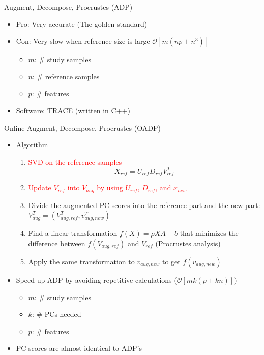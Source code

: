 \documentclass{beamer}
\newcommand{\bO}{\mathcal{O}}
\begin{document}
\begin{frame}{Augment, Decompose, Procrustes (ADP)}
    \begin{itemize}
    \item Pro: Very accurate (The golden standard)
    \item Con: Very slow when reference size is large $\bO[m(np+n^3)]$
        \begin{itemize}
        \item $m$: \# study samples
        \item $n$: \# reference samples
        \item $p$: \# features
        \end{itemize}
    \item Software: TRACE (written in C++) 
    \end{itemize}
\end{frame}

\begin{frame}{Online Augment, Decompose, Procrustes (OADP)}
\begin{itemize}
\item Algorithm
    \begin{enumerate}
    \item \textcolor{red}{SVD on the reference samples}
        \[
            X_{ref} = U_{ref} D_{ref} V_{ref}^T
        \]
    \item \textcolor{red}{Update $V_{ref}$ into $V_{aug}$ by using $U_{ref}$, $D_{ref}$, and $x_{new}$}
    \item Divide the augmented PC scores
        into the reference part and the new part:
        $V_{aug}^T = (V_{aug, ref}^T, v_{aug, new}^T)$
    \item Find a linear transformation
        $f(X) = \rho XA + b$ 
        that minimizes the difference between
        $f(V_{aug,ref})$ and $V_{ref}$
        (Procrustes analysis)
    \item Apply the same transformation to $v_{aug,new}$
        to get $f(v_{aug,new})$
    \end{enumerate}
\item Speed up ADP by avoiding repetitive calculations
    ($\bO[mk(p+kn)])$
    \begin{itemize}
    \item $m$: \# study samples
    \item $k$: \# PCs needed
    \item $p$: \# features
    \end{itemize}
\item PC scores are almost identical to ADP's
\end{itemize}
\end{frame}
\end{document}
